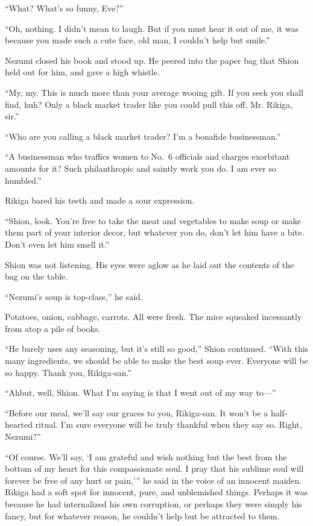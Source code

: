 ``What? What's so funny, Eve?''

``Oh, nothing. I didn't mean to laugh. But if you must hear it out of
me, it was because you made such a cute face, old man, I couldn't help
but smile.''

Nezumi closed his book and stood up. He peered into the paper bag that
Shion held out for him, and gave a high whistle.

``My, my. This is much more than your average wooing gift. If you seek
you shall find, huh? Only a black market trader like you could pull this
off, Mr. Rikiga, sir.''

``Who are you calling a black market trader? I'm a bonafide
businessman.''

``A businessman who traffics women to No.~6 officials and charges
exorbitant amounts for it? Such philanthropic and saintly work you do. I
am ever so humbled.''

Rikiga bared his teeth and made a sour expression.

``Shion, look. You're free to take the meat and vegetables to make soup
or make them part of your interior decor, but whatever you do, don't let
him have a bite. Don't even let him smell it.''

Shion was not listening. His eyes were aglow as he laid out the contents
of the bag on the table.

``Nezumi's soup is top-class,'' he said.

Potatoes, onion, cabbage, carrots. All were fresh. The mice squeaked
incessantly from atop a pile of books.

``He barely uses any seasoning, but it's still so good,'' Shion
continued. ``With this many ingredients, we should be able to make the
best soup ever. Everyone will be so happy. Thank you, Rikiga-san.''

``Ah\el but, well, Shion. What I'm saying is that I went out of my way
to---''

``Before our meal, we'll say our graces to you, Rikiga-san. It won't be
a half-hearted ritual. I'm sure everyone will be truly thankful when
they say so. Right, Nezumi?''

``Of course. We'll say, `I am grateful and wish nothing but the best
from the bottom of my heart for this compassionate soul. I pray that his
sublime soul will forever be free of any hurt or pain,''' he said in the
voice of an innocent maiden. Rikiga had a soft spot for innocent, pure,
and unblemished things. Perhaps it was because he had internalized his
own corruption, or perhaps they were simply his fancy, but for whatever
reason, he couldn't help but be attracted to them.

